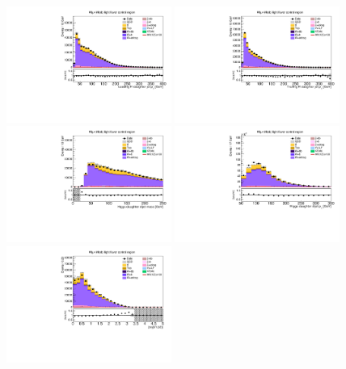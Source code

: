 \begin{figure}[tbp]
  \begin{center}
    \includegraphics[width=0.48\textwidth]{figures/wlnhbb2016/resolved/WmnWHLightFlavorCR_Hbjet1Pt.pdf}
    \includegraphics[width=0.48\textwidth]{figures/wlnhbb2016/resolved/WmnWHLightFlavorCR_Hbjet2Pt.pdf}
    \includegraphics[width=0.48\textwidth]{figures/wlnhbb2016/resolved/WmnWHLightFlavorCR_mH.pdf}
    \includegraphics[width=0.48\textwidth]{figures/wlnhbb2016/resolved/WmnWHLightFlavorCR_pTH.pdf}
    \includegraphics[width=0.48\textwidth]{figures/wlnhbb2016/resolved/WmnWHLightFlavorCR_dEtab1b2.pdf}

\end{center}
\end{figure}
